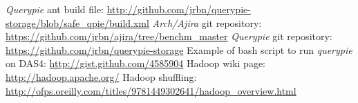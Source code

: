 \begin{thebibliography}{99}
		{\emph{Querypie} ant build file: \url{http://github.com/jrbn/querypie-storage/blob/safe_qpie/build.xml}}
		{\emph{Arch/Ajira} git repository: \url{https://github.com/jrbn/ajira/tree/benchm_master}}
		{\emph{Querypie} git repository: \url{https://github.com/jrbn/querypie-storage}}
		{Example of bash script to run \emph{querypie} on DAS4: \url{http://gist.github.com/4585904}}
		{Hadoop wiki page: \url{http://hadoop.apache.org/}}
		{Hadoop shuffling: \url{http://ofps.oreilly.com/titles/9781449302641/hadoop_overview.html}}
\end{thebibliography}
